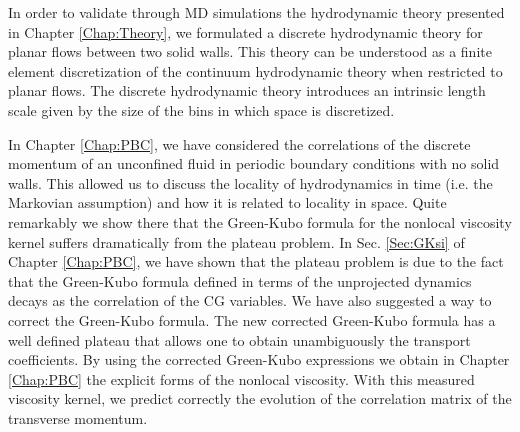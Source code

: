 \documentclass[b5paper,openright,10pt]{book}
\begin{document}

In order to validate through MD simulations the hydrodynamic theory presented in Chapter \ref{Chap:Theory}, 
we formulated a discrete hydrodynamic theory for planar flows between two solid walls. 
This theory  can  be understood  as a  finite
element discretization  of the  continuum hydrodynamic theory  
when restricted  to  planar  flows.  The  discrete
hydrodynamic theory introduces an intrinsic  length scale given by the
size of the bins in which space is discretized.  

In  Chapter \ref{Chap:PBC},  we   have  considered  the
correlations  of  the discrete  momentum  of  an unconfined  fluid  in
periodic boundary conditions with no solid walls.  This allowed us
to discuss the  locality of hydrodynamics in time  (i.e. the Markovian
assumption)  and  how it  is  related  to  locality in  space.   Quite
remarkably  we  show there  that  the  Green-Kubo formula  for  the
nonlocal  viscosity  kernel  suffers dramatically  from  the  plateau
problem.  In Sec. \ref{Sec:GKsi} of Chapter \ref{Chap:PBC}, we have  shown that the plateau problem is
due to  the fact that the  Green-Kubo formula defined in  terms of the
unprojected dynamics  decays as the  correlation of the  CG variables.
We  have  also  suggested a  way  to  correct  the
Green-Kubo formula.  The  new corrected Green-Kubo formula  has a well
defined plateau that  allows one to obtain  unambiguously the transport
coefficients.  By using the corrected Green-Kubo expressions we obtain
in Chapter \ref{Chap:PBC}
the explicit  forms of  the nonlocal  viscosity.  With  this measured
viscosity  kernel,   we  predict   correctly  the  evolution   of  the
correlation matrix of the transverse momentum.
\end{document}
